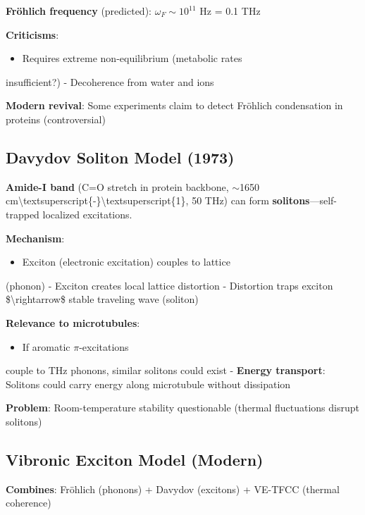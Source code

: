 \textbf{Fröhlich frequency} (predicted): \(\omega_F \sim 10^{11}\) Hz =
0.1 THz

\textbf{Criticisms}:
\begin{itemize}
\item Requires extreme non-equilibrium (metabolic rates
\end{itemize}

insufficient?) - Decoherence from water and ions

\textbf{Modern revival}: Some experiments claim to detect Fröhlich
condensation in proteins (controversial)

\subsection{Davydov Soliton Model
(1973)}\label{davydov-soliton-model-1973}

\textbf{Amide-I band} (C=O stretch in protein backbone,
$\sim$1650
cm\textbackslash textsuperscript\{-\}\textbackslash textsuperscript\{1\},
50 THz) can form \textbf{solitons}---self-trapped localized
excitations.

\textbf{Mechanism}:
\begin{itemize}
\item Exciton (electronic excitation) couples to lattice
\end{itemize}

(phonon) - Exciton creates local lattice distortion - Distortion traps
exciton \$\textbackslash rightarrow\$ stable traveling wave (soliton)

\textbf{Relevance to microtubules}:
\begin{itemize}
\item If aromatic \(\pi\)-excitations
\end{itemize}

couple to THz phonons, similar solitons could exist - \textbf{Energy
transport}: Solitons could carry energy along microtubule without
dissipation

\textbf{Problem}: Room-temperature stability questionable (thermal
fluctuations disrupt solitons)

\subsection{Vibronic Exciton Model
(Modern)}\label{vibronic-exciton-model-modern}

\textbf{Combines}: Fröhlich (phonons) + Davydov (excitons) + VE-TFCC
(thermal coherence)

